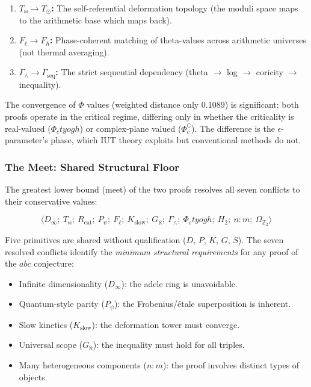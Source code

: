 \documentclass[12pt,a4paper]{article}
\begin{document}
\begin{enumerate}
    \item \textbf{$T_{\bowtie} \to T_{\odot}$:} The self-referential deformation topology (the moduli space maps to the arithmetic base which maps back).
    \item \textbf{$F_{\ell} \to F_{\hbar}$:} Phase-coherent matching of theta-values across arithmetic universes (not thermal averaging).
    \item \textbf{$\Gamma_{\wedge} \to \Gamma_\text{seq}$:} The strict sequential dependency (theta $\rightarrow$ log $\rightarrow$ coricity $\rightarrow$ inequality).
\end{enumerate}

The convergence of $\Phi$ values (weighted distance only 0.1089) is significant: both proofs operate in the critical regime, differing only in whether the criticality is real-valued ($\Phi_ctyogh$) or complex-plane valued ($\Phi_c^\mathbb{C}$). The difference is the $\epsilon$-parameter's phase, which IUT theory exploits but conventional methods do not.

\subsubsection{The Meet: Shared Structural Floor}

The greatest lower bound (meet) of the two proofs resolves all seven conflicts to their conservative values:

\[\langle D_{\infty};\ T_{\bowtie};\ R_\text{cat};\ P_{\psi};\ F_{\ell};\ K_\text{slow};\ G_{\aleph};\ \Gamma_{\wedge};\ \Phi_ctyogh;\ H_2;\ n{:}m;\ \Omega_{\mathbb{Z}_2} \rangle\]

Five primitives are shared without qualification ($D$, $P$, $K$, $G$, $S$). The seven resolved conflicts identify the \emph{minimum structural requirements} for any proof of the $abc$ conjecture:

\begin{itemize}
    \item Infinite dimensionality ($D_{\infty}$): the adele ring is unavoidable.
    \item Quantum-style parity ($P_{\psi}$): the Frobenius/étale superposition is inherent.
    \item Slow kinetics ($K_\text{slow}$): the deformation tower must converge.
    \item Universal scope ($G_{\aleph}$): the inequality must hold for all triples.
    \item Many heterogeneous components ($n{:}m$): the proof involves distinct types of objects.
\end{itemize}
\end{document}
